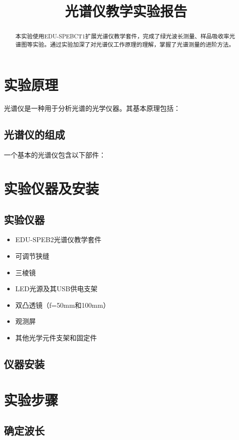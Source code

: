 \documentclass{ctexart}
\title{光谱仪教学实验报告}
\begin{document}
\maketitle

\begin{abstract}
本实验使用EDU-SPEBCT1扩展光谱仪教学套件，完成了绿光波长测量、样品吸收率光谱图等实验。通过实验加深了对光谱仪工作原理的理解，掌握了光谱测量的进阶方法。
\end{abstract}

\section{实验原理}

光谱仪是一种用于分析光谱的光学仪器。其基本原理包括：

\subsection{光谱仪的组成}
一个基本的光谱仪包含以下部件：

\section{实验仪器及安装}
\subsection{实验仪器}
\begin{itemize}
    \item EDU-SPEB2光谱仪教学套件
    \item 可调节狭缝
    \item 三棱镜
    \item LED光源及其USB供电支架
    \item 双凸透镜（f=50mm和100mm）
    \item 观测屏
    \item 其他光学元件支架和固定件
\end{itemize}
\subsection{仪器安装}
\section{实验步骤}
\subsection{确定波长}
\end{document}
